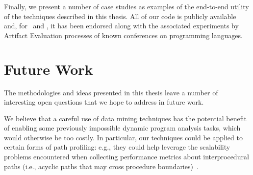 Finally, we present a number of case studies as examples of the end-to-end utility of the techniques described in this thesis. All of our code is publicly available and, for \kblpp\ and \osrkit, it has been endorsed along with the associated experiments by Artifact Evaluation processes of known conferences on programming languages.

\section*{Future Work}
The methodologies and ideas presented in this thesis leave a number of interesting open questions that we hope to address in future work.

We believe that a careful use of data mining techniques has the potential benefit of enabling some previously impossible dynamic program analysis tasks, which would otherwise be too costly. In particular, our techniques could be applied to certain forms of path profiling: e.g., they could help leverage the scalability problems encountered when collecting performance metrics about interprocedural paths (i.e., acyclic paths that may cross procedure boundaries)~\cite{Melski99}.